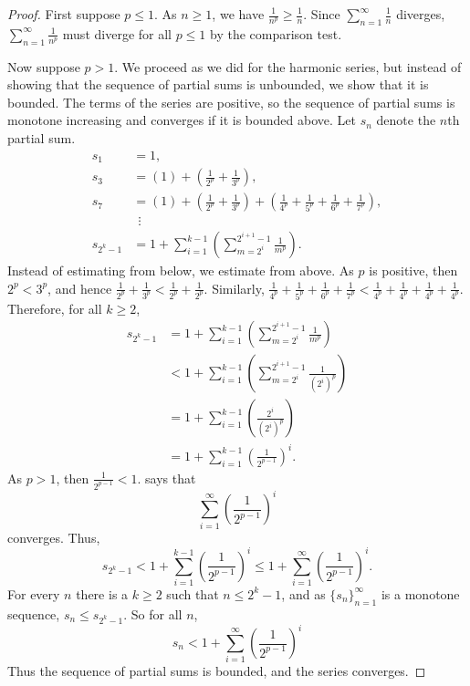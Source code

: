 \begin{proof}
First suppose $p \leq 1$.
As $n \geq 1$, we have
$\frac{1}{n^p} \geq \frac{1}{n}$.  Since
$\sum_{n=1}^\infty \frac{1}{n}$ diverges,
$\sum_{n=1}^\infty \frac{1}{n^p}$ must diverge for all $p \leq 1$ by the comparison test.

Now suppose $p > 1$.
We proceed as we did for the
harmonic series, but instead of showing that the sequence
of partial sums is unbounded, we show that it is bounded.
The terms of the series are positive, so the sequence of partial sums
is monotone increasing and converges if it is bounded
above.
Let $s_n$ denote the $n$th partial sum.
\begin{align*}
 s_1 & = 1 , \\
 s_3 & = \left( 1 \right) + \left( \frac{1}{2^p} + \frac{1}{3^p} \right) , \\
 s_7 & = \left( 1 \right) + \left( \frac{1}{2^p} + \frac{1}{3^p} \right) +
        \left( \frac{1}{4^p} + \frac{1}{5^p} + \frac{1}{6^p} + \frac{1}{7^p} \right) , \\
& ~~ \vdots \\
 s_{2^k - 1} &= 
1 + 
\sum_{i=1}^{k-1}
\left(
\sum_{m=2^i}^{2^{i+1}-1} \frac{1}{m^p}
\right) .
\end{align*}
Instead of estimating from below, we estimate from above.
As $p$ is positive, then $2^p < 3^p$, and hence
$\frac{1}{2^p} + \frac{1}{3^p} <
\frac{1}{2^p} + \frac{1}{2^p}$.  Similarly,
$\frac{1}{4^p} + \frac{1}{5^p} +
\frac{1}{6^p} + \frac{1}{7^p} <
\frac{1}{4^p} + \frac{1}{4^p} +
\frac{1}{4^p} + \frac{1}{4^p}$.  Therefore,
for all $k \geq 2$,
\begin{equation*}
\begin{split}
s_{2^k-1}
& =
1+
\sum_{i=1}^{k-1}
\left(
\sum_{m=2^{i}}^{2^{i+1}-1} \frac{1}{m^p}
\right) 
\\
& <
1+
\sum_{i=1}^{k-1}
\left(
\sum_{m=2^{i}}^{2^{i+1}-1} \frac{1}{{(2^i)}^p}
\right) 
\\
& =
1+
\sum_{i=1}^{k-1}
\left(
\frac{2^i}{{(2^i)}^p}
\right) 
\\
& =
1+
\sum_{i=1}^{k-1}
{\left(
\frac{1}{2^{p-1}}
\right)}^i .
\end{split}
\end{equation*}
As $p > 1$, then $\frac{1}{2^{p-1}} < 1$.
 says that
\begin{equation*}
\sum_{i=1}^\infty
{\left(
\frac{1}{2^{p-1}}
\right)}^i
\end{equation*}
converges.  Thus,
\begin{equation*}
s_{2^k-1} < 
1+
\sum_{i=1}^{k-1}
{\left(
\frac{1}{2^{p-1}}
\right)}^i 
\leq 
1+
\sum_{i=1}^\infty
{\left(
\frac{1}{2^{p-1}}
\right)}^i .
\end{equation*}
For every $n$ there is a $k \geq 2$ such that $n \leq 2^k-1$, and
as $\{ s_n \}_{n=1}^\infty$ is a monotone sequence, $s_n \leq s_{2^k-1}$.
So for all $n$,
\begin{equation*}
s_n < 
1+
\sum_{i=1}^\infty
{\left(
\frac{1}{2^{p-1}}
\right)}^i
\end{equation*}
Thus the sequence of partial sums is bounded, and the series converges.
\end{proof}

